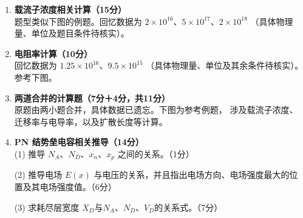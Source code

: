 \documentclass[UTF8,a4paper,12pt]{ctexart}
\begin{document}
	\begin{enumerate}[label=\arabic*.,leftmargin=2.2em,itemsep=0.8em]
		
		\item \textbf{载流子浓度相关计算（15分）}\\
		题型类似下图的例题。回忆数据为
		$2\times10^{16}$、$5\times10^{17}$、$2\times10^{18}$
		（具体物理量、单位及题目条件待核实）。
		
		\item \textbf{电阻率计算（10分）}\\
		回忆数据为 $1.25\times10^{16}$、$9.5\times10^{15}$
		（具体物理量、单位及其余条件待核实）。参考下图。
		
		\item \textbf{两道合并的计算题（7分＋4分，共11分）}\\
		原题由两小题合并，具体数据已遗忘。下图为参考例题，
		涉及载流子浓度、迁移率与电导率，以及扩散长度等计算。
		
		\item \textbf{PN 结势垒电容相关推导（14分）}\\
		(1) 推导 $N_A$、$N_D$、$x_n$、$x_p$ 之间的关系。（1分）
		\par (2) 推导电场 $E(x)$ 与电压的关系，并且指出电场方向、电场强度最大的位置及其电场强度值。（6分）
		\par (3) 求耗尽层宽度 $X_D$与$N_A$、$N_D$、$V_D$的关系式。（7分）
		
	\end{enumerate}
	
\end{document}
